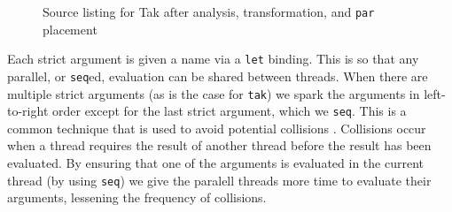 \begin{figure}[!h]
  
\caption{Source listing for Tak after analysis, transformation, and \texttt{par} placement}
\label{fig:takParred}
\end{figure}

Each strict argument is given a name via a \verb-let- binding. This is so that
any parallel, or \verb-seq-ed, evaluation can be shared between threads. When
there are multiple strict arguments (as is the case for \verb-tak-) we spark
the arguments in left-to-right order except for the last strict argument, which
we \verb-seq-. This is a common technique that is used to avoid potential
collisions \citep{strategies}. Collisions occur when a thread requires the
result of another thread before the result has been evaluated. By ensuring that
one of the arguments is evaluated in the current thread (by using \texttt{seq})
we give the paralell threads more time to evaluate their arguments, lessening
the frequency of collisions.

%
%
%

%

